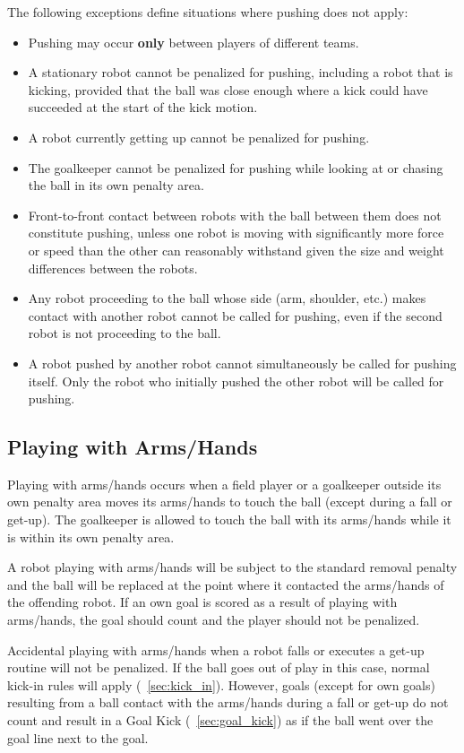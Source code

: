 The following exceptions define situations where pushing does not apply:
\begin{itemize}
  \item Pushing may occur \textbf{only} between players of different teams.
  \item A stationary robot cannot be penalized for pushing, including a robot that is kicking, provided that the ball was close enough where a kick could have succeeded at the start of the kick motion.
  \item A robot currently getting up cannot be penalized for pushing.
  \item The goalkeeper cannot be penalized for pushing while looking at or chasing the ball in its own penalty area.
  \item Front-to-front contact between robots with the ball between them does not constitute pushing, unless one robot is moving with significantly more force or speed than the other can reasonably withstand given the size and weight differences between the robots.
  \item Any robot proceeding to the ball whose side (arm, shoulder, etc.) makes contact with another robot cannot be called for pushing, even if the second robot is not proceeding to the ball.
  \item A robot pushed by another robot cannot simultaneously be called for pushing itself. Only the robot who initially pushed the other robot will be called for pushing.
\end{itemize}

\subsection{Playing with Arms/Hands}
\label{sec:playing_with_hands}

Playing with arms/hands occurs when a field player or a goalkeeper outside its own penalty area moves its arms/hands to touch the ball (except during a fall or get-up). The goalkeeper is allowed to touch the ball with its arms/hands while it is within its own penalty area.

A robot playing with arms/hands will be subject to the standard removal penalty and the ball will be replaced at the point where it contacted the arms/hands of the offending robot. If an own goal is scored as a result of playing with arms/hands, the goal should count and the player should not be penalized.

Accidental playing with arms/hands when a robot falls or executes a get-up routine will not be penalized. If the ball goes out of play in this case, normal kick-in rules will apply (\cf~\cref{sec:kick_in}). However, goals (except for own goals) resulting from a ball contact with the arms/hands during a fall or get-up do not count and result in a Goal Kick (\cf~\cref{sec:goal_kick}) as if the ball went over the goal line next to the goal.

